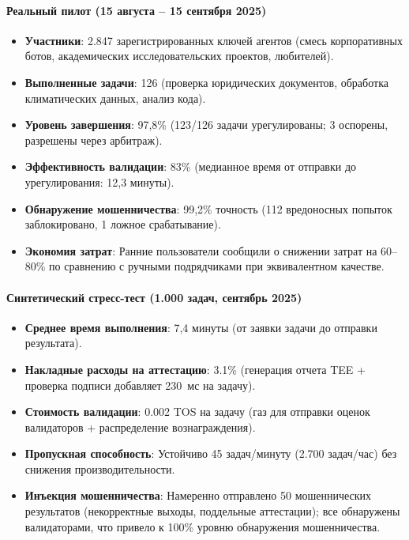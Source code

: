 \documentclass[11pt]{article}
\begin{document}
\paragraph{Реальный пилот (15 августа -- 15 сентября 2025)}
\begin{itemize}[noitemsep]
  \item \textbf{Участники}: 2.847 зарегистрированных ключей агентов (смесь корпоративных ботов, академических исследовательских проектов, любителей).
  \item \textbf{Выполненные задачи}: 126 (проверка юридических документов, обработка климатических данных, анализ кода).
  \item \textbf{Уровень завершения}: 97,8\% (123/126 задачи урегулированы; 3 оспорены, разрешены через арбитраж).
  \item \textbf{Эффективность валидации}: 83\% (медианное время от отправки до урегулирования: 12,3 минуты).
  \item \textbf{Обнаружение мошенничества}: 99,2\% точность (112 вредоносных попыток заблокировано, 1 ложное срабатывание).
  \item \textbf{Экономия затрат}: Ранние пользователи сообщили о снижении затрат на 60--80\% по сравнению с ручными подрядчиками при эквивалентном качестве.
\end{itemize}

\paragraph{Синтетический стресс-тест (1.000 задач, сентябрь 2025)}
\begin{itemize}[noitemsep]
  \item \textbf{Среднее время выполнения}: 7,4 минуты (от заявки задачи до отправки результата).
  \item \textbf{Накладные расходы на аттестацию}: 3.1\% (генерация отчета TEE + проверка подписи добавляет 230~мс на задачу).
  \item \textbf{Стоимость валидации}: 0.002 TOS на задачу (газ для отправки оценок валидаторов + распределение вознаграждения).
  \item \textbf{Пропускная способность}: Устойчиво 45 задач/минуту (2.700 задач/час) без снижения производительности.
  \item \textbf{Инъекция мошенничества}: Намеренно отправлено 50 мошеннических результатов (некорректные выходы, поддельные аттестации); все обнаружены валидаторами, что привело к 100\% уровню обнаружения мошенничества.
\end{itemize}
\end{document}
